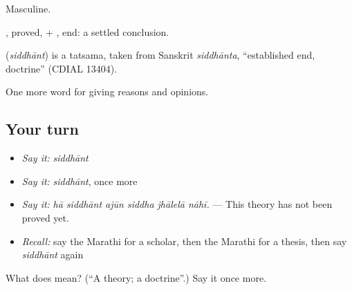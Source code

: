 Masculine.

, proved, + , end: a settled conclusion.

\begin{cousinweb}
\textbf{} (\emph{siddhānt}) is a tatsama, taken from Sanskrit \emph{siddhānta}, \textquotedblleft{}established end, doctrine\textquotedblright{} (CDIAL 13404).
\end{cousinweb}

\begin{grammarlens}[title={What you've built}]
One more word for giving reasons and opinions.
\end{grammarlens}

\subsection*{Your turn}
\begin{itemize}
\raggedright
  \item \emph{Say it:} \emph{siddhānt}
  \item \emph{Say it:} \emph{siddhānt}, once more
  \item \emph{Say it:} \emph{hā siddhānt ajūn siddha jhālelā nāhī.} — This theory has not been proved yet.
  \item \emph{Recall:} say the Marathi for a scholar, then the Marathi for a thesis, then say \emph{siddhānt} again
\end{itemize}

\begin{tcolorbox}[breakable,colback=teal!4,colframe=teal!35!black,title={Before you move on}]
What does  mean? (\textquotedblleft{}A theory; a doctrine\textquotedblright{}.) Say it once more.
\end{tcolorbox}
